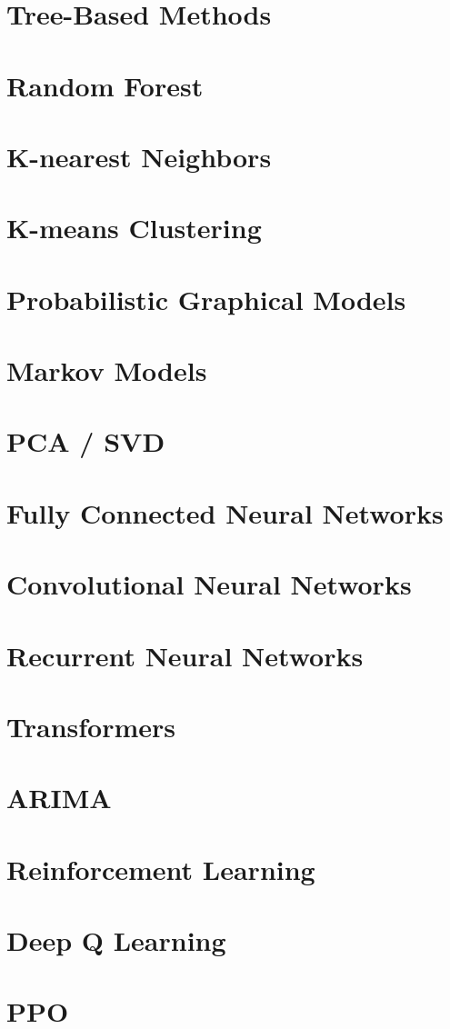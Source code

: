 \documentclass{article}
\begin{document}
	\section*{Tree-Based Methods}
	
	\section*{Random Forest}
	
	\section*{K-nearest Neighbors}
	
	\section*{K-means Clustering}
	
	\section*{Probabilistic Graphical Models}
	
	\section*{Markov Models}
	
	\section*{PCA / SVD}
	
	\section*{Fully Connected Neural Networks}
	
	\section*{Convolutional Neural Networks}
	
	\section*{Recurrent Neural Networks}
	
	\section*{Transformers}	
	
	\section*{ARIMA}
	
	\section*{Reinforcement Learning}
	
	\section*{Deep Q Learning}
	
	\section*{PPO}
	
\end{document}
